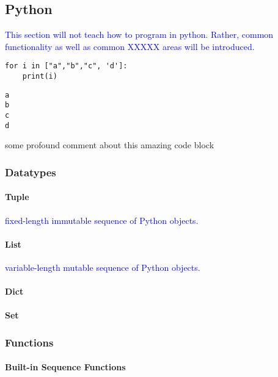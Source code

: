 \subsection{Python}

\textcolor{blue}{This section will not teach how to program in python. Rather, common functionality as well as common XXXXX areas will be introduced.}

\begin{lstlisting}[style=pyInStyle]
for i in ["a","b","c", 'd']:
    print(i)
\end{lstlisting}

\begin{lstlisting}[style=pyOutStyle]
a
b
c
d
\end{lstlisting}
\begin{markdown}
some profound comment about this amazing code block
\end{markdown}

\subsubsection{Datatypes}

\paragraph{Tuple}

\textcolor{blue}{fixed-length immutable sequence of Python objects.}

\paragraph{List}

\textcolor{blue}{variable-length mutable sequence of Python objects.}

\paragraph{Dict}

\paragraph{Set}

\subsubsection{Functions}

\paragraph{Built-in Sequence Functions}


